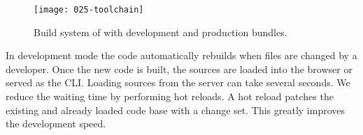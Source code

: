 \documentclass[../ClassicThesis.tex]{subfiles}
\begin{document}
\begin{figure}[h]
  \centering
  \texttt{[image: 025-toolchain]}
  \caption{Build system of {\platener} with development and
    production bundles.}
  \label{fig:toolchain}
\end{figure}

In development mode the code automatically rebuilds when
files are changed by a developer. Once the new code is
built, the sources are loaded into the browser or served as
the CLI. Loading sources from the server can take several
seconds. We reduce the waiting time by performing hot
reloads. A hot reload patches the existing and already
loaded code base with a change set. This greatly improves
the development speed.









\end{document}
